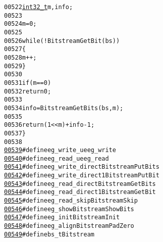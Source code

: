 \begin{footnotesize}
\begin{alltt}
00522     \hyperlink{_types_8h_a115ba3a1b24a8702355c5dbd61ce01e0}{int32_t} m, info;
00523     
00524     m = 0;
00525     
00526     \textcolor{keywordflow}{while} (!BitstreamGetBit(bs))
00527     \{
00528         m ++;
00529     \}
00530     
00531     \textcolor{keywordflow}{if} (m == 0)
00532         \textcolor{keywordflow}{return} 0;
00533 
00534     info = BitstreamGetBits(bs, m);
00535     
00536     \textcolor{keywordflow}{return} (1 << m) + info - 1;
00537 \}
00538 
\hypertarget{_bitstream_8h_source_l00539}{}\hyperlink{_bitstream_8h_a3619cb729f31034ff847cbfd0730fce9}{00539} \textcolor{preprocessor}{#define eg\_write\_ue eg\_write}
\hypertarget{_bitstream_8h_source_l00540}{}\hyperlink{_bitstream_8h_acad61027e3182912d2b9d95180d45250}{00540} \textcolor{preprocessor}{}\textcolor{preprocessor}{#define eg\_read\_ue eg\_read}
\hypertarget{_bitstream_8h_source_l00541}{}\hyperlink{_bitstream_8h_af690deb7a81fc44af3c41dfe5d715468}{00541} \textcolor{preprocessor}{}\textcolor{preprocessor}{#define eg\_write\_direct BitstreamPutBits}
\hypertarget{_bitstream_8h_source_l00542}{}\hyperlink{_bitstream_8h_a62eb10ad34743e34384612d0fc2e77ea}{00542} \textcolor{preprocessor}{}\textcolor{preprocessor}{#define eg\_write\_direct1 BitstreamPutBit}
\hypertarget{_bitstream_8h_source_l00543}{}\hyperlink{_bitstream_8h_a3474bd178129247b388e870a0bd602a3}{00543} \textcolor{preprocessor}{}\textcolor{preprocessor}{#define eg\_read\_direct BitstreamGetBits}
\hypertarget{_bitstream_8h_source_l00544}{}\hyperlink{_bitstream_8h_a930f8a3acc36d15b74015dd4579f485c}{00544} \textcolor{preprocessor}{}\textcolor{preprocessor}{#define eg\_read\_direct1 BitstreamGetBit}
\hypertarget{_bitstream_8h_source_l00545}{}\hyperlink{_bitstream_8h_ae09cd1235b1976cf290bee9c7367ddd5}{00545} \textcolor{preprocessor}{}\textcolor{preprocessor}{#define eg\_read\_skip BitstreamSkip}
\hypertarget{_bitstream_8h_source_l00546}{}\hyperlink{_bitstream_8h_a89ddca586685b00a8a2fc90ec3514172}{00546} \textcolor{preprocessor}{}\textcolor{preprocessor}{#define eg\_show BitstreamShowBits}
\hypertarget{_bitstream_8h_source_l00547}{}\hyperlink{_bitstream_8h_a61fc36305218f7be0282e50aac1b9e40}{00547} \textcolor{preprocessor}{}\textcolor{preprocessor}{#define eg\_init BitstreamInit}
\hypertarget{_bitstream_8h_source_l00548}{}\hyperlink{_bitstream_8h_a53785f0677c9615aca67cddf358fa337}{00548} \textcolor{preprocessor}{}\textcolor{preprocessor}{#define eg\_align BitstreamPadZero}
\hypertarget{_bitstream_8h_source_l00549}{}\hyperlink{_bitstream_8h_aabc09bc7d3d7c6f1b928b0f8cc7da050}{00549} \textcolor{preprocessor}{}\textcolor{preprocessor}{#define bs\_t Bitstream}

\end{alltt}
\end{footnotesize}
